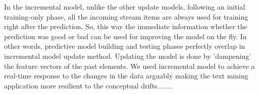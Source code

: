 \begin{center} In the incremental model, unlike the other update models, following an initial training-only phase, all the incoming stream items are always used for training right after the prediction. So, this way the immediate information whether the prediction was good or bad can be used for improving the model on the fly. In other words, predictive model building and testing phases perfectly overlap in incremental model update method. Updating the model is done by 'dampening' the feature vectors of the past elements. We used incremental model to achieve a real-time response to the changes in the data arguably making the text mining application more resilient to the conceptual drifts........ \end{center}
